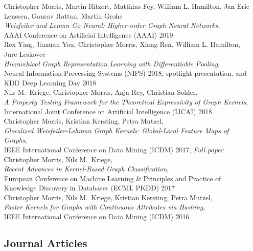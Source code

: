 \documentclass[11pt, a4paper]{scrartcl}
\newcommand{\years}[1]{\marginnote {\bf #1}}
\begin{document}
\years{2019}Christopher Morris, Martin Ritzert, Matthias Fey, William L. Hamilton, Jan Eric Lenssen, Gaurav Rattan, Martin Grohe  \\
\emph{Weisfeiler and Leman Go Neural: Higher-order Graph Neural Networks},\\
AAAI Conference on Artificial Intelligence (AAAI) 2019 \\


\years{2018} Rex Ying, Jiaxuan You, Christopher Morris, Xiang Ren, William L. Hamilton, Jure Leskovec \\
\emph{Hierarchical Graph Representation Learning with Differentiable Pooling},\\
 Neural Information Processing Systems (NIPS) 2018, spotlight presentation, and KDD Deep Learning Day 2018 \\

Nils M.~Kriege, Christopher Morris, Anja Rey, Christian Sohler,\\
\emph{A Property Testing Framework for the Theoretical Expressivity of Graph Kernels},\\
International Joint Conference on Artificial Intelligence (IJCAI) 2018\\

\years{2017} Christopher Morris, Kristian Kersting, Petra Mutzel,\\
\emph{Glocalized Weisfeiler-Lehman Graph Kernels: Global-Local Feature Maps of Graphs},\\
IEEE International Conference on Data Mining (ICDM) 2017, \emph{Full paper}\\

 Christopher Morris, Nils M.~Kriege,\\
\emph{Recent Advances in Kernel-Based Graph Classification},\\
European Conference on Machine Learning \& Principles and Practice of Knowledge Discovery in Databases (ECML PKDD) 2017\\

\years{2016} Christopher Morris, Nils M.~Kriege, Kristian Kersting, Petra Mutzel,\\
\emph{Faster Kernels for Graphs with Continuous Attributes via Hashing},\\
IEEE International Conference on Data Mining (ICDM) 2016

\subsection*{Journal Articles}
\end{document}
